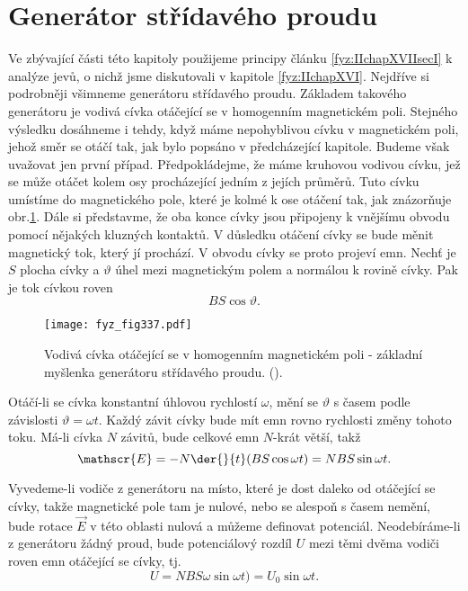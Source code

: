 \section{Generátor střídavého proudu}\label{fyz:IIchapXVIIsecV}
  Ve zbývající části této kapitoly použijeme principy článku \ref{fyz:IIchapXVIIsecI} k analýze 
  jevů, o nichž jsme diskutovali v kapitole \ref{fyz:IIchapXVI}. Nejdříve si podrobněji všimneme 
  generátoru střídavého proudu. Základem takového generátoru je vodivá cívka otáčející se v 
  homogenním magnetickém poli. Stejného výsledku dosáhneme i tehdy, když máme nepohyblivou cívku v 
  magnetickém poli, jehož směr se otáčí tak, jak bylo popsáno v předcházející kapitole. Budeme však 
  uvažovat jen první případ. Předpokládejme, že máme kruhovou vodivou cívku, jež se může otáčet 
  kolem osy procházející jedním z jejích průměrů. Tuto cívku umístíme do magnetického pole, které 
  je kolmé k ose otáčení tak, jak znázorňuje obr.\ref{fyz:fig337}. Dále si představme, že oba konce 
  cívky jsou připojeny k vnějšímu obvodu pomocí nějakých kluzných kontaktů. V důsledku otáčení 
  cívky se bude měnit magnetický tok, který jí prochází. V obvodu cívky se proto projeví emn. Nechť 
  je \(S\) plocha cívky a \(\vartheta\) úhel mezi magnetickým polem a normálou k rovině cívky. Pak 
  je tok cívkou roven
  \begin{equation}\label{fyz:eq390}
    BS\cos\vartheta.
  \end{equation}
  
  \begin{figure}[ht!]  %
    \centering
    \texttt{[image: fyz\_fig337.pdf]}
    \caption{Vodivá cívka otáčející se v homogenním magnetickém poli - základní myšlenka generátoru 
             střídavého proudu.
             (\cite[s.~301]{Feynman02}).}
    \label{fyz:fig337}
  \end{figure}
  Otáčí-li se cívka konstantní úhlovou rychlostí \(\omega\), mění se \(\vartheta\) s časem podle 
  závislosti \(\vartheta = \omega t\). Každý závit cívky bude mít emn rovno rychlosti změny tohoto 
  toku. Má-li cívka \(N\) závitů, bude celkové emn \(N\)-krát větší, takž
  \begin{equation}\label{fyz:eq391}
    \mathscr{E} = - N\der{ }{t}(BS\cos\omega t)= NBS\sin\omega t.
  \end{equation}
  
  Vyvedeme-li vodiče z generátoru na místo, které je dost daleko od otáčející se cívky, takže 
  magnetické pole tam je nulové, nebo se alespoň s časem nemění, bude rotace \(\vec{E}\) v této 
  oblasti nulová a můžeme definovat potenciál. Neodebíráme-li z generátoru žádný proud, bude 
  potenciálový rozdíl \(U\) mezi těmi dvěma vodiči roven emn otáčející se cívky, tj.
  \begin{equation}\label{fyz:eq392}
    U = NBS\omega\sin\omega t)= U_0\sin\omega t.
  \end{equation}
  
